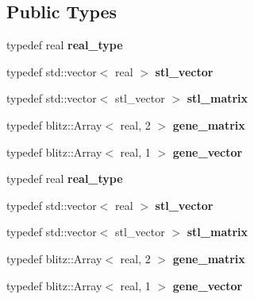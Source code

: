 \subsection*{Public Types}
\begin{DoxyCompactItemize}
\item 
\mbox{\label{classblitz__interface_a71bc6d9fcb4e572cd654031859baef7e}} 
typedef real {\bfseries real\+\_\+type}
\item 
\mbox{\label{classblitz__interface_a0f70f5e547319d7d9d401957a03598e7}} 
typedef std\+::vector$<$ real $>$ {\bfseries stl\+\_\+vector}
\item 
\mbox{\label{classblitz__interface_a30aa4331eccca708856e133b66b164dd}} 
typedef std\+::vector$<$ stl\+\_\+vector $>$ {\bfseries stl\+\_\+matrix}
\item 
\mbox{\label{classblitz__interface_aa24290043187ce20da802ad0f225b3f6}} 
typedef blitz\+::\+Array$<$ real, 2 $>$ {\bfseries gene\+\_\+matrix}
\item 
\mbox{\label{classblitz__interface_ad808bd31468f44d2ef93007ff178274c}} 
typedef blitz\+::\+Array$<$ real, 1 $>$ {\bfseries gene\+\_\+vector}
\item 
\mbox{\label{classblitz__interface_a71bc6d9fcb4e572cd654031859baef7e}} 
typedef real {\bfseries real\+\_\+type}
\item 
\mbox{\label{classblitz__interface_a0f70f5e547319d7d9d401957a03598e7}} 
typedef std\+::vector$<$ real $>$ {\bfseries stl\+\_\+vector}
\item 
\mbox{\label{classblitz__interface_a30aa4331eccca708856e133b66b164dd}} 
typedef std\+::vector$<$ stl\+\_\+vector $>$ {\bfseries stl\+\_\+matrix}
\item 
\mbox{\label{classblitz__interface_aa24290043187ce20da802ad0f225b3f6}} 
typedef blitz\+::\+Array$<$ real, 2 $>$ {\bfseries gene\+\_\+matrix}
\item 
\mbox{\label{classblitz__interface_ad808bd31468f44d2ef93007ff178274c}} 
typedef blitz\+::\+Array$<$ real, 1 $>$ {\bfseries gene\+\_\+vector}
\end{DoxyCompactItemize}
